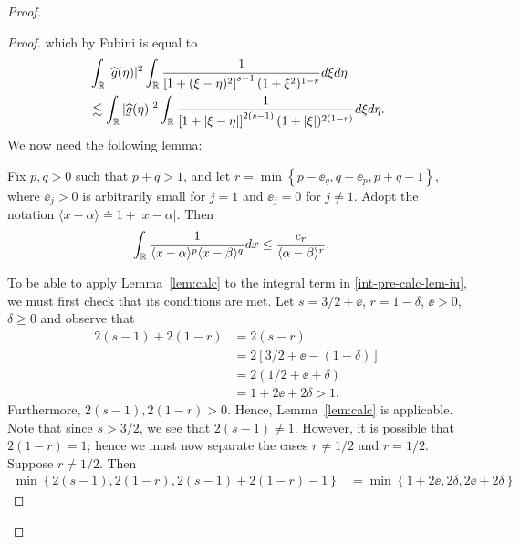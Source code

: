 \begin{proof}
\begin{proof}
which by Fubini is equal to
%
%
\begin{equation}
\label{int-pre-calc-lem-iu}
\begin{split}
& \int_{\mathbb{R}} | \widehat{g}(\eta) |^{2} \int_{\mathbb{R}} \frac{1}{\left[
1 + (\xi - \eta)^{2} \right]^{s-1} (1 + \xi^{2})^{1-r}} d \xi d \eta
\\
& \lesssim \int_{\mathbb{R}} | \widehat{g}(\eta) |^{2} \int_{\mathbb{R}} \frac{1}{\left[
1 + |\xi - \eta| \right]^{2(s-1)} (1 + |\xi|)^{2(1-r)}} d \xi d \eta.
\end{split}
\end{equation}
%
We now need the following lemma: 
%
%
\begin{lemma}
\label{lem:calc}
%
Fix $p, q > 0$ such that $p +q >1$, and let $r =\min\left\{p - \ee_{q}, q -
\ee_{p}, p+q-1 \right\}$, where $\ee_{j} > 0$ is arbitrarily small for $j = 1$
and $\ee_{j} = 0$ for $j \neq 1$. Adopt the notation
$\langle x - \alpha \rangle  \doteq 1 + | x - \alpha |$. Then 
%
\begin{equation*}
\begin{split}
& \int_{\mathbb{R}} \frac{1}{\langle x - \alpha \rangle ^{p} \langle x -
\beta \rangle
^{q}} d x
\le \frac{c_{r}}{\langle \alpha - \beta \rangle ^{r}}. 
\end{split}
\end{equation*}
\end{lemma}
%
To be able to apply Lemma~\ref{lem:calc} to the integral term in \eqref{int-pre-calc-lem-iu}, 
we must first check
that its conditions are met. Let $ s = 3/2 + \ee$, $r = 1- \delta$, $\ee > 0$, $
\delta \ge 0$ and observe that
%
%
\begin{equation*}
\begin{split}
2(s-1) + 2(1-r)
& = 2(s-r)
\\
& = 2[3/2 + \ee - (1 - \delta)]
\\
& = 2(1/2 + \ee + \delta)
\\
& = 1 + 2 \ee + 2 \delta > 1.
\end{split}
\end{equation*}
%
%
Furthermore, $2(s-1), 2(1-r) > 0$. Hence, Lemma~\ref{lem:calc} is applicable. 
Note that since $s > 3/2$, we see that $2(s-1) \neq 1$. However, it is possible that $2(1-r) =1$; hence we must now separate the cases $r \neq 1/2$ and $r = 1/2$. Suppose $r \neq 1/2$. Then 
%
%
\begin{equation*}
\begin{split}
\min\left\{ 2(s-1), 2(1-r), 2(s-1) + 2(1-r) -1 \right\}
& = \min\left\{ 1 + 2 \ee, 2 \delta, 2\ee + 2 \delta \right\}

\end{split}
\end{equation*}
\end{proof}
\end{proof}
